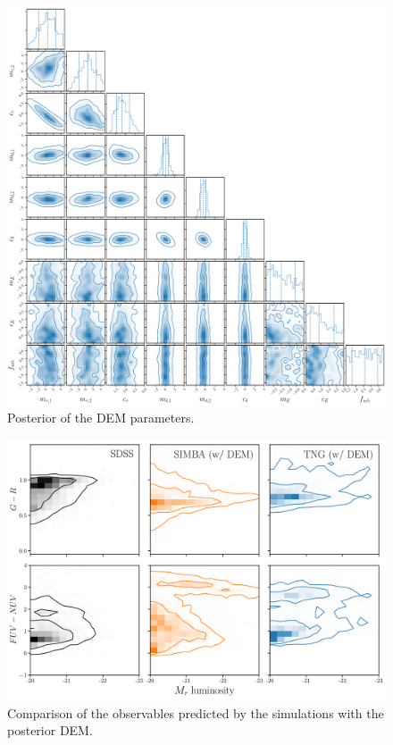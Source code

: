 \begin{figure}
\begin{center}
    \includegraphics[width=\textwidth]{figs/abc.pdf}
    \caption{Posterior of the DEM parameters.}
\label{fig:dem}
\end{center}
\end{figure}

\begin{figure}
\begin{center}
    \includegraphics[width=\textwidth]{figs/abc_observables.pdf}
    \caption{Comparison of the observables predicted by the simulations with
    the posterior DEM.}
\label{fig:dem}
\end{center}
\end{figure}
